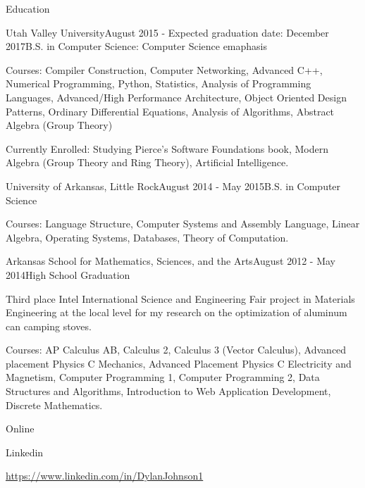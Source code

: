 \documentclass{resume} %
\begin{document}
\begin{rSection}{Education}

\begin{rSubsection}{Utah Valley University}{August 2015 - Expected graduation date: December 2017}{B.S. in Computer Science: Computer Science emaphasis}
\item Courses: Compiler Construction, Computer Networking, Advanced C++, Numerical Programming, Python, Statistics, Analysis of Programming Languages, Advanced/High Performance Architecture, Object Oriented Design Patterns, Ordinary Differential Equations, Analysis of Algorithms, Abstract Algebra (Group Theory)
\item Currently Enrolled: Studying Pierce's Software Foundations book, Modern Algebra (Group Theory and Ring Theory), Artificial Intelligence.
\end{rSubsection}

\begin{rSubsection}{University of Arkansas, Little Rock}{August 2014 - May 2015}{B.S. in Computer Science}
	\item Courses: Language Structure, Computer Systems and Assembly Language, Linear Algebra, Operating Systems, Databases, Theory of Computation.
\end{rSubsection}

\begin{rSubsection}{Arkansas School for Mathematics, Sciences, and the Arts}{August 2012 - May 2014}{High School Graduation}
	\item Third place Intel International Science and Engineering Fair project in Materials Engineering at the local level for my research on the optimization of aluminum can camping stoves.
	\item Courses: AP Calculus AB, Calculus 2, Calculus 3 (Vector Calculus), Advanced placement Physics C Mechanics, Advanced Placement Physics C Electricity and Magnetism, Computer Programming 1, Computer Programming 2, Data Structures and Algorithms, Introduction to Web Application Development, Discrete Mathematics.
\end{rSubsection}

\end{rSection}

\begin{rSection}{Online}

\begin{rSubsection}{Linkedin}{}{}{}
	\item {\href{https://www.linkedin.com/in/DylanJohnson1}{https://www.linkedin.com/in/DylanJohnson1}}
\end{rSubsection}

\end{rSection}
\end{document}
